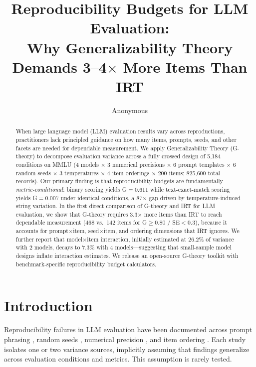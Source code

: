 \documentclass[letterpaper]{article}
\title{Reproducibility Budgets for LLM Evaluation:\\Why Generalizability Theory Demands 3--4$\times$ More Items Than IRT}
\author{Anonymous}
\date{}
\begin{document}
\maketitle

\begin{abstract}
When large language model (LLM) evaluation results vary across reproductions, practitioners lack principled guidance on how many items, prompts, seeds, and other facets are needed for dependable measurement. We apply Generalizability Theory (G-theory) to decompose evaluation variance across a fully crossed design of 5,184 conditions on MMLU (4 models $\times$ 3 numerical precisions $\times$ 6 prompt templates $\times$ 6 random seeds $\times$ 3 temperatures $\times$ 4 item orderings $\times$ 200 items; 825,600 total records). Our primary finding is that reproducibility budgets are fundamentally \emph{metric-conditional}: binary scoring yields G$=$0.611 while text-exact-match scoring yields G$=$0.007 under identical conditions, a 87$\times$ gap driven by temperature-induced string variation. In the first direct comparison of G-theory and IRT for LLM evaluation, we show that G-theory requires 3.3$\times$ more items than IRT to reach dependable measurement (468 vs.\ 142 items for G$\geq$0.80 / SE$<$0.3), because it accounts for prompt$\times$item, seed$\times$item, and ordering dimensions that IRT ignores. We further report that model$\times$item interaction, initially estimated at 26.2\% of variance with 2 models, decays to 7.3\% with 4 models---suggesting that small-sample model designs inflate interaction estimates. We release an open-source G-theory toolkit with benchmark-specific reproducibility budget calculators.
\end{abstract}

\section{Introduction}

Reproducibility failures in LLM evaluation have been documented across prompt phrasing \citep{mizrahi2024state,lu2024prompts}, random seeds \citep{bouthillier2021accounting}, numerical precision \citep{yuan2025llm}, and item ordering \citep{pezeshkpour2024large,lu2022fantastically}. Each study isolates one or two variance sources, implicitly assuming that findings generalize across evaluation conditions and metrics. This assumption is rarely tested.
\end{document}
